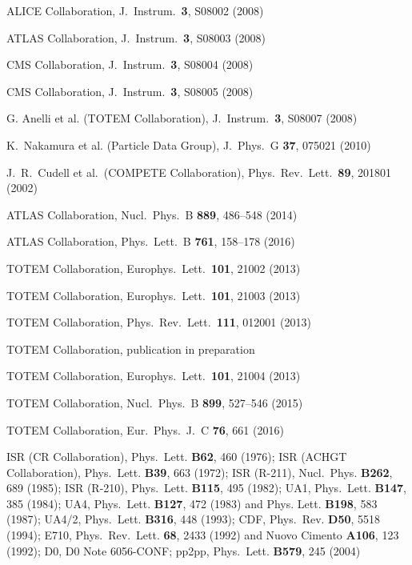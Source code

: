 \documentclass{webofc}
\def\Name#1{#1}
\def\REVIEW#1#2#3#4{#1 \textbf{#2}, #4 (#3)}
\begin{document}


\begin{thebibliography}{}

	ALICE Collaboration, J.~Instrum.~\textbf{3}, S08002 (2008)

	ATLAS Collaboration, J.~Instrum.~\textbf{3}, S08003 (2008)

	CMS Collaboration, J.~Instrum.~\textbf{3}, S08004 (2008)

	CMS Collaboration, J.~Instrum.~\textbf{3}, S08005 (2008)

	G. Anelli et al. (TOTEM Collaboration), J.~Instrum.~\textbf{3}, S08007 (2008)

	K.~Nakamura et al. (Particle Data Group), J.~Phys.~G \textbf{37}, 075021 (2010)

	J.~R.~Cudell et al.~(COMPETE Collaboration), Phys.~Rev.~Lett.~\textbf{89}, 201801 (2002)

	ATLAS Collaboration, Nucl.~Phys.~B \textbf{889}, 486--548 (2014)

	ATLAS Collaboration, Phys.~Lett.~B \textbf{761}, 158--178 (2016)

	TOTEM Collaboration, Europhys.~Lett.~\textbf{101}, 21002 (2013)

	TOTEM Collaboration, Europhys.~Lett.~\textbf{101}, 21003 (2013)

	TOTEM Collaboration, Phys.~Rev.~Lett.~\textbf{111}, 012001 (2013)

	TOTEM Collaboration, publication in preparation

	TOTEM Collaboration, Europhys.~Lett.~\textbf{101}, 21004 (2013)

	TOTEM Collaboration, Nucl.~Phys.~B \textbf{899}, 527--546 (2015)

	TOTEM Collaboration, Eur.~Phys.~J.~C \textbf{76}, 661 (2016)

	\Name{ISR (CR Collaboration)}, \REVIEW{Phys.~Lett.}{B62}{1976}{460}; 
	\Name{ISR (ACHGT Collaboration)}, \REVIEW{Phys.~Lett.}{B39}{1972}{663}; 
	\Name{ISR (R-211)}, \REVIEW{Nucl.~Phys.}{B262}{1985}{689}; 
	\Name{ISR (R-210)}, \REVIEW{Phys.~Lett.}{B115}{1982}{495}; 
	\Name{UA1}, \REVIEW{Phys.~Lett.}{B147}{1984}{385}; 
	\Name{UA4}, \REVIEW{Phys.~Lett.}{B127}{1983}{472} and \REVIEW{Phys. Lett.}{B198}{1987}{583}; 
	\Name{UA4/2}, \REVIEW{Phys.~Lett.}{B316}{1993}{448}; 
	\Name{CDF}, \REVIEW{Phys.~Rev.}{D50}{1994}{5518}; 
	\Name{E710}, \REVIEW{Phys.~Rev.~Lett.}{68}{1992}{2433} and \REVIEW{Nuovo Cimento}{A106}{1992}{123}; 
	\Name{D0}, D0 Note 6056-CONF; 
	\Name{pp2pp}, \REVIEW{Phys.~Lett.}{B579}{2004}{245}


\end{thebibliography}
\end{document}
